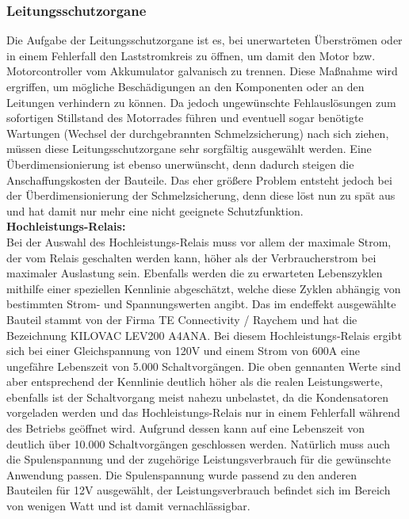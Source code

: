 \newpage



\subsubsection{Leitungsschutzorgane}
Die Aufgabe der Leitungsschutzorgane ist es, bei unerwarteten Überströmen oder in einem Fehlerfall den Laststromkreis zu öffnen, um damit den Motor bzw. Motorcontroller vom Akkumulator galvanisch zu trennen. Diese Maßnahme wird ergriffen, um mögliche Beschädigungen an den Komponenten oder an den Leitungen verhindern zu können. Da jedoch ungewünschte Fehlauslösungen zum sofortigen Stillstand des Motorrades führen und eventuell sogar benötigte Wartungen (Wechsel der durchgebrannten Schmelzsicherung) nach sich ziehen, müssen diese Leitungsschutzorgane sehr sorgfältig ausgewählt werden. Eine Überdimensionierung ist ebenso unerwünscht, denn dadurch steigen die Anschaffungskosten der Bauteile. Das eher größere Problem entsteht jedoch bei der Überdimensionierung der Schmelzsicherung, denn diese löst nun zu spät aus und hat damit nur mehr eine nicht geeignete Schutzfunktion. 
\\[5mm]

\textbf{Hochleistungs-Relais:}
\\[2mm]
Bei der Auswahl des Hochleistungs-Relais muss vor allem der maximale Strom, der vom Relais geschalten werden kann, höher als der Verbraucherstrom bei maximaler Auslastung sein. Ebenfalls werden die zu erwarteten Lebenszyklen mithilfe einer speziellen Kennlinie abgeschätzt, welche diese Zyklen abhängig von bestimmten Strom- und Spannungswerten angibt. Das im endeffekt ausgewählte Bauteil stammt von der Firma \glqq TE Connectivity / Raychem\grqq{} und hat die Bezeichnung \glqq KILOVAC LEV200 A4ANA\grqq{}. Bei diesem Hochleistungs-Relais ergibt sich bei einer Gleichspannung von 120V und einem Strom von 600A eine ungefähre Lebenszeit von 5.000 Schaltvorgängen. Die oben gennanten Werte sind aber entsprechend der Kennlinie deutlich höher als die realen Leistungswerte, ebenfalls ist der Schaltvorgang meist nahezu unbelastet, da die Kondensatoren vorgeladen werden und das Hochleistungs-Relais nur in einem Fehlerfall während des Betriebs geöffnet wird. Aufgrund dessen kann auf eine Lebenszeit von deutlich über 10.000 Schaltvorgängen geschlossen werden. Natürlich muss auch die Spulenspannung und der zugehörige Leistungsverbrauch für die gewünschte Anwendung passen. Die Spulenspannung wurde passend zu den anderen Bauteilen für 12V ausgewählt, der Leistungsverbrauch befindet sich im Bereich von wenigen Watt und ist damit vernachlässigbar.
\\[5mm]

